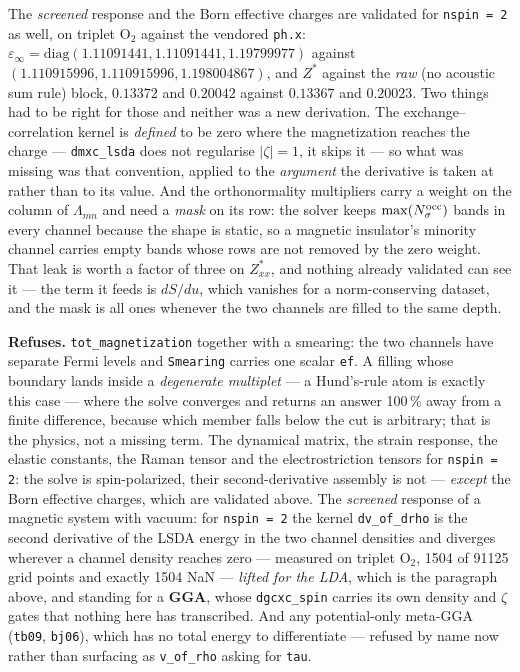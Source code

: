\documentclass[11pt,a4paper]{article}
\newcommand{\code}[1]{\texttt{\small #1}}
\begin{document}
The \emph{screened} response and the Born effective charges are validated for
\code{nspin = 2} as well, on triplet O$_2$ against the vendored \code{ph.x}:
$\varepsilon_\infty = \mathrm{diag}(1.11091441, 1.11091441, 1.19799977)$ against
$(1.110915996, 1.110915996, 1.198004867)$, and $Z^*$ against the \emph{raw}
(no acoustic sum rule) block, $0.13372$ and $0.20042$ against $0.13367$ and
$0.20023$. Two things had to be right for those and neither was a new
derivation. The exchange--correlation kernel is \emph{defined} to be zero where
the magnetization reaches the charge --- \code{dmxc\_lsda} does not regularise
$|\zeta| = 1$, it skips it --- so what was missing was that convention, applied
to the \emph{argument} the derivative is taken at rather than to its value.
And the orthonormality multipliers carry a weight on the column of
$\Lambda_{mn}$ and need a \emph{mask} on its row: the solver keeps
$\max(N^{\rm occ}_\sigma)$ bands in every channel because the shape is static,
so a magnetic insulator's minority channel carries empty bands whose rows are
not removed by the zero weight. That leak is worth a factor of three on
$Z^*_{xx}$, and nothing already validated can see it --- the term it feeds is
$dS/du$, which vanishes for a norm-conserving dataset, and the mask is all ones
whenever the two channels are filled to the same depth.

\begin{refuses}
\textbf{Refuses.} \code{tot\_magnetization} together with a smearing: the two
channels have separate Fermi levels and \code{Smearing} carries one scalar
\code{ef}. A filling whose boundary lands inside a \emph{degenerate multiplet}
--- a Hund's-rule atom is exactly this case --- where the solve converges and
returns an answer 100\,\% away from a finite difference, because which member
falls below the cut is arbitrary; that is the physics, not a missing term. The
dynamical matrix, the strain response, the elastic
constants, the Raman tensor and the electrostriction tensors for
\code{nspin = 2}: the solve is spin-polarized, their second-derivative assembly
is not --- \emph{except} the Born effective charges, which are validated above. The \emph{screened} response of a magnetic system with vacuum: for
\code{nspin = 2} the kernel \code{dv\_of\_drho} is the second derivative of the
LSDA energy in the two channel densities and diverges wherever a channel density
reaches zero --- measured on triplet O$_2$, 1504 of 91125 grid points and exactly
1504 NaN --- \emph{lifted for the LDA}, which is the paragraph above, and
standing for a \textbf{GGA}, whose \code{dgcxc\_spin} carries its own density
and $\zeta$ gates that nothing here has transcribed. And any potential-only
meta-GGA (\code{tb09}, \code{bj06}), which has
no total energy to differentiate --- refused by name now rather than surfacing as
\code{v\_of\_rho} asking for \code{tau}.
\end{refuses}
\end{document}
